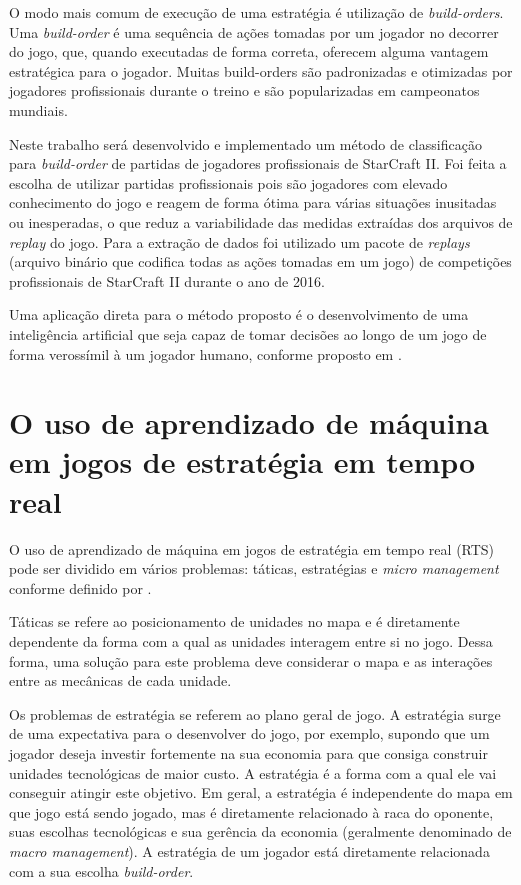 O modo mais comum de execução de uma estratégia é utilização de \textit{\glspl{build-order}}. Uma \textit{\gls{build-order}} é uma sequência de ações tomadas por um jogador no decorrer do jogo, que, quando executadas de forma correta, oferecem alguma vantagem estratégica para o jogador. Muitas \glspl{build-order} são padronizadas e otimizadas por jogadores profissionais durante o treino e são popularizadas em campeonatos mundiais.

Neste trabalho será desenvolvido e implementado um método de classificação para \textit{\gls{build-order}} de partidas de jogadores profissionais de StarCraft II. Foi feita a escolha de utilizar partidas profissionais pois são jogadores com elevado conhecimento do jogo e reagem de forma ótima para várias situações inusitadas ou inesperadas, o que reduz a variabilidade das medidas extraídas dos arquivos de \textit{\gls{replay}} do jogo. Para a extração de dados foi utilizado um pacote de \textit{\glspl{replay}} (arquivo binário que codifica todas as ações tomadas em um jogo) de competições profissionais de StarCraft II durante o ano de 2016.

Uma aplicação direta para o método proposto é o desenvolvimento de uma inteligência artificial que seja capaz de tomar decisões ao longo de um jogo de forma verossímil à um jogador humano, conforme proposto em \cite{synnaeve2011bayesian1}.

		\section{O uso de aprendizado de máquina em jogos de estratégia em tempo real}
O uso de aprendizado de máquina em jogos de estratégia em tempo real (RTS) pode ser dividido em vários problemas: táticas, estratégias e \textit{micro management} conforme definido por \cite{synnaeve2011bayesian2}.

Táticas se refere ao posicionamento de \glspl{unidade} no mapa e é diretamente dependente da forma com a qual as \glspl{unidade} interagem entre si no jogo. Dessa forma, uma solução para este problema deve considerar o mapa e as interações entre as mecânicas de cada \gls{unidade}.

Os problemas de estratégia se referem ao plano geral de jogo. A estratégia surge de uma expectativa para o desenvolver do jogo, por exemplo, supondo que um jogador deseja investir fortemente na sua economia para que consiga construir \glspl{unidade} tecnológicas de maior custo. A estratégia é a forma com a qual ele vai conseguir atingir este objetivo. Em geral, a estratégia é independente do mapa em que jogo está sendo jogado, mas é diretamente relacionado à \gls{raca} do oponente, suas escolhas tecnológicas e sua gerência da economia (geralmente denominado de \textit{macro management}). A estratégia de um jogador está diretamente relacionada com a sua escolha \textit{\gls{build-order}}.

